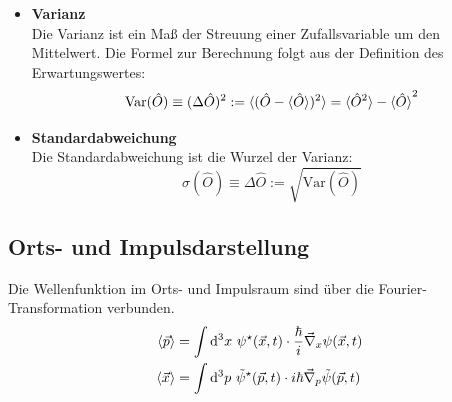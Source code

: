 \documentclass{article}
\newcommand{\diff}{\mathrm{d}}
\begin{document}
\begin{itemize}
		wobei für niederdimensionale Probleme eine 1- bzw. 2-dimensionale Integration auftritt.
		
		
		\item \textbf{Varianz}\\
		Die Varianz ist ein Maß der Streuung einer Zufallsvariable um den Mittelwert. Die Formel zur Berechnung folgt aus der Definition des Erwartungswertes:
			\begin{equation}
				\text{Var}(\hat{O}) \equiv (\Delta \hat{O})^2 := \braket{ ( \hat{O} - \braket{\hat{O}} )^2 } = \braket{\hat{O}^2} - \braket{\hat{O}}^2
			\end{equation}
		
		
		\item \textbf{Standardabweichung}\\
		Die Standardabweichung ist die Wurzel der Varianz:
			\begin{equation}
				\sigma(\hat{O}) \equiv \Delta\hat{O} := \sqrt{ \text{Var}(\hat{O}) }
			\end{equation}
	\end{itemize}


\newpage


\subsection{Orts- und Impulsdarstellung}
Die Wellenfunktion im Orts- und Impulsraum sind über die Fourier-Transformation verbunden.
	\begin{align}
		\braket{\vec{p}} &= \int \diff^3 x\ \psi^\star(\vec{x},t) \cdot \frac{\hbar}{i}\vec{\nabla}_x \psi(\vec{x},t) \\
		\braket{\vec{x}} &= \int \diff^3 p\ \tilde{\psi}^\star(\vec{p},t) \cdot i\hbar\vec{\nabla}_p \tilde{\psi}(\vec{p},t)
	\end{align}
\end{document}
